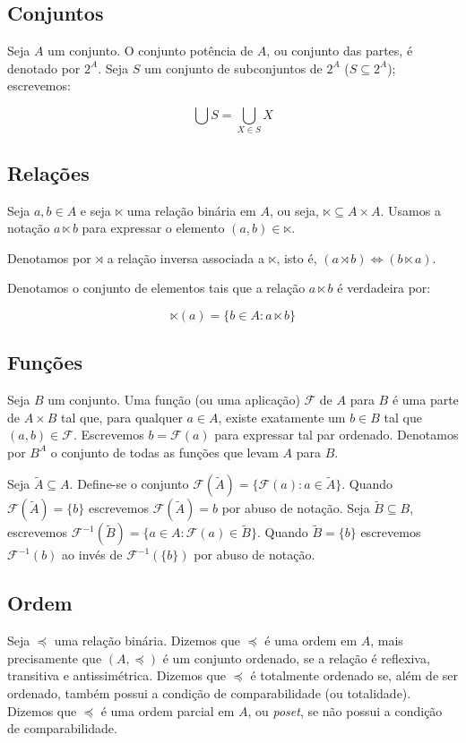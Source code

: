 \subsection{Conjuntos}

Seja $A$ um conjunto. O conjunto potência de $A$, ou conjunto das partes,
é denotado por $2^{A}$. Seja $S$ um conjunto de subconjuntos de $2^{A}$ 
($S \subseteq 2^{A}$); escrevemos:

$$\bigcup S = \bigcup_{X \in S} X$$

\subsection{Relações}

Seja $a, b \in A$ e seja $\ltimes$ uma relação binária em $A$, ou seja,
$\ltimes \subseteq A \times A$. Usamos a notação $a \ltimes b$ para expressar
o elemento $(a, b) \in \ltimes$.

Denotamos por $\rtimes$ a relação inversa associada a $\ltimes$, isto é,
$(a \rtimes b) \iff (b \ltimes a)$.

Denotamos o conjunto de elementos tais que a relação
$a \ltimes b$ é verdadeira por:

$$\ltimes(a) = \{ b \in A : a \ltimes b\}$$

\subsection{Funções}

Seja $B$ um conjunto. Uma função (ou uma aplicação) $\mathcal{F}$ de $A$
para $B$ é uma parte de $A \times B$ tal que, para qualquer $a \in A$, existe
exatamente um $b \in B$ tal que $(a, b) \in \mathcal{F}$. Escrevemos
$b = \mathcal{F}(a)$ para expressar tal par ordenado. Denotamos por
$B^{A}$ o conjunto de todas as funções que levam $A$ para $B$.

Seja $\widetilde{A} \subseteq A$. Define-se o conjunto
$\mathcal{F}(\widetilde{A}) = \{\mathcal{F}(a) : a \in \widetilde{A}\}$.
Quando $\mathcal{F}(\widetilde{A}) = \{b\}$ escrevemos
$\mathcal{F}(\widetilde{A}) = b$ por abuso de notação. Seja
$\widetilde{B} \subseteq B$, escrevemos
$\mathcal{F}^{-1}(\widetilde{B}) = \{a \in A : \mathcal{F}(a) \in \widetilde{B}\}$.
Quando $\widetilde{B} = \{b\}$ escrevemos $\mathcal{F}^{-1}(b)$ ao invés de
$\mathcal{F}^{-1}(\{b\})$ por abuso de notação.

\subsection{Ordem}
Seja $\preccurlyeq$ uma relação binária. Dizemos que $\preccurlyeq$ é uma ordem
em $A$, mais precisamente que $(A, \preccurlyeq)$ é um conjunto ordenado, se
a relação é reflexiva, transitiva e antissimétrica. Dizemos que $\preccurlyeq$
é totalmente ordenado se, além de ser ordenado, também possui a condição de
comparabilidade (ou totalidade). Dizemos que $\preccurlyeq$ é uma ordem
parcial em $A$, ou \textit{poset}, se não possui a condição de comparabilidade.

